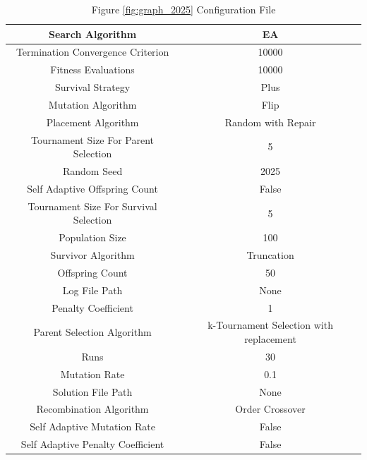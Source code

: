\documentclass{standalone}
\begin{document}
\begin{table}[!htb]
	\centering
	\caption{Figure \ref{fig:graph_2025} Configuration File}
	\label{tab:graph_2025}
	\begin{tabular}{| c | c |}
		\hline
		Search Algorithm		& EA		 \\
		\hline
		Termination Convergence Criterion		& 10000		 \\
		\hline
		Fitness Evaluations		& 10000		 \\
		\hline
		Survival Strategy		& Plus		 \\
		\hline
		Mutation Algorithm		& Flip		 \\
		\hline
		Placement Algorithm		& Random with Repair		 \\
		\hline
		Tournament Size For Parent Selection		& 5		 \\
		\hline
		Random Seed		& 2025		 \\
		\hline
		Self Adaptive Offspring Count		& False		 \\
		\hline
		Tournament Size For Survival Selection		& 5		 \\
		\hline
		Population Size		& 100		 \\
		\hline
		Survivor Algorithm		& Truncation		 \\
		\hline
		Offspring Count		& 50		 \\
		\hline
		Log File Path		& None		 \\
		\hline
		Penalty Coefficient		& 1		 \\
		\hline
		Parent Selection Algorithm		& k-Tournament Selection with replacement		 \\
		\hline
		Runs		& 30		 \\
		\hline
		Mutation Rate		& 0.1		 \\
		\hline
		Solution File Path		& None		 \\
		\hline
		Recombination Algorithm		& Order Crossover		 \\
		\hline
		Self Adaptive Mutation Rate		& False		 \\
		\hline
		Self Adaptive Penalty Coefficient		& False		 \\
		\hline
	\end{tabular}
\end{table}
\end{document}

